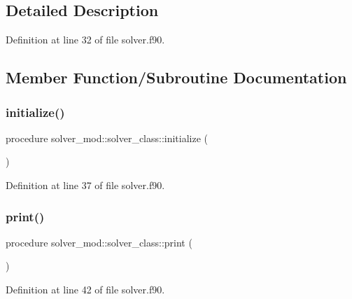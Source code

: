 \subsection{Detailed Description}


Definition at line 32 of file solver.\+f90.



\subsection{Member Function/\+Subroutine Documentation}
\mbox{\label{structsolver__mod_1_1solver__class_a9ac72acd3e4fbb8881c7eaabe9e3d585}} 
\subsubsection{\texorpdfstring{initialize()}{initialize()}}
{\footnotesize\ttfamily procedure solver\+\_\+mod\+::solver\+\_\+class\+::initialize (\begin{DoxyParamCaption}{ }\end{DoxyParamCaption})\hspace{0.3cm}{\ttfamily [private]}}



Definition at line 37 of file solver.\+f90.

\mbox{\label{structsolver__mod_1_1solver__class_ac61135f89371079744ac9b5fd8da8a41}} 
\subsubsection{\texorpdfstring{print()}{print()}}
{\footnotesize\ttfamily procedure solver\+\_\+mod\+::solver\+\_\+class\+::print (\begin{DoxyParamCaption}{ }\end{DoxyParamCaption})\hspace{0.3cm}{\ttfamily [private]}}



Definition at line 42 of file solver.\+f90.

